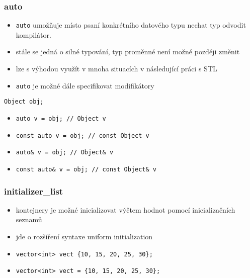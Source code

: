 
\begin{frame}[fragile]
\frametitle{auto}
\begin{block}{}
\begin{itemize}
\item \lstinline|auto| umožňuje místo psaní konkrétního datového typu nechat typ odvodit kompilátor. 
\item stále se jedná o silné typování, typ proměnné není možné později změnit
\item lze s výhodou využít v mnoha situacích v následující práci s STL
\item \lstinline|auto| je možné dále specifikovat modifikátory
\end{itemize}
\end{block}	

\begin{yesblock}
\lstinline|Object obj;|
\begin{itemize}
\item \lstinline|auto v = obj; // Object v|
\item \lstinline|const auto v = obj; // const Object v|
\item \lstinline|auto& v = obj; // Object& v|
\item \lstinline|const auto& v = obj; // const Object& v|
\end{itemize}
\end{yesblock}
\end{frame}

\begin{frame}[fragile]
\frametitle{initializer\_list}
\begin{block}{}
\begin{itemize}
\item kontejnery je možné inicializovat výčtem hodnot pomocí inicializačních seznamů
\item jde o rozšíření syntaxe uniform initialization
\end{itemize}
\end{block}

\begin{yesblock}
\begin{itemize}
\item  \lstinline|vector<int> vect {10, 15, 20, 25, 30};|
\item  \lstinline|vector<int> vect = {10, 15, 20, 25, 30};|
\end{itemize}
\end{yesblock}	
\end{frame}





